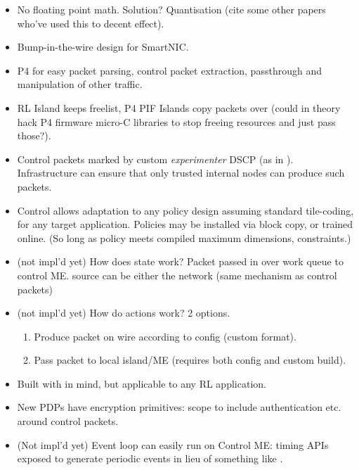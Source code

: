 \documentclass[sigconf,natbib=false]{acmart}
\begin{document}
\begin{itemize}
	\item No floating point math. Solution? Quantisation (cite some other papers who've used this to decent effect).
	
	\item Bump-in-the-wire design for SmartNIC.
	
	\item P4 for easy packet parsing, control packet extraction, passthrough and manipulation of other traffic.
	
	\item RL Island keeps freelist, P4 PIF Islands copy packets over (could in theory hack P4 firmware micro-C libraries to stop freeing resources and just pass those?).
	
	\item Control packets marked by custom \emph{experimenter} DSCP (as in \textcite{DBLP:conf/isca/LiLYCSH19}). Infrastructure can ensure that only trusted internal nodes can produce such packets.
	
	\item Control allows adaptation to any policy design assuming standard tile-coding, for any target application. Policies may be installed via block copy, or trained online. (So long as policy meets compiled maximum dimensions, constraints.)
	
	\item (not impl'd yet) How does state work? Packet passed in over work queue to control ME. source can be either the network (same mechanism as control packets)
	
	\item (not impl'd yet) How do actions work? 2 options.
	\begin{enumerate}
		\item Produce packet on wire according to config (custom format).
		\item Pass packet to local island/ME (requires both config and custom build).
	\end{enumerate}

	\item Built with \Textcite{DBLP:journals/tnsm/SimpsonRP20} in mind, but applicable to any RL application.
	
	\item New PDPs have encryption primitives: scope to include authentication etc. around control packets.
	
	\item (Not impl'd yet) Event loop can easily run on Control ME: timing APIs exposed to generate periodic events in lieu of something like \textcite{DBLP:conf/hotnets/IbanezABM19}.
\end{itemize}
\end{document}
